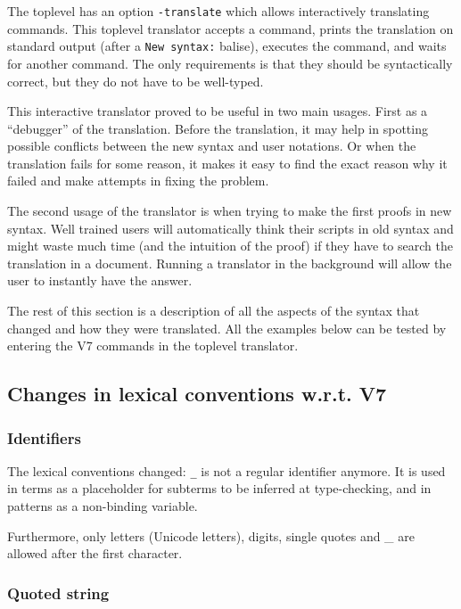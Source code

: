 \documentclass[11pt,a4paper]{article}
\def\TERM#1{\texttt{#1}}
\begin{document}
The toplevel has an option {\tt -translate} which allows
interactively translating commands. This toplevel translator accepts a
command, prints the translation on standard output (after a %
\verb+New syntax:+ balise), executes the command, and waits for another
command. The only requirements is that they should be syntactically
correct, but they do not have to be well-typed.

This interactive translator proved to be useful in two main
usages. First as a ``debugger'' of the translation. Before the
translation, it may help in spotting possible conflicts between the
new syntax and user notations. Or when the translation fails for some
reason, it makes it easy to find the exact reason why it failed and
make attempts in fixing the problem.

The second usage of the translator is when trying to make the first
proofs in new syntax. Well trained users will automatically think
their scripts in old syntax and might waste much time (and the
intuition of the proof) if they have to search the translation in a
document. Running a translator in the background will allow the user
to instantly have the answer.

The rest of this section is a description of all the aspects of the
syntax that changed and how they were translated. All the examples
below can be tested by entering the V7 commands in the toplevel
translator.



\subsection{Changes in lexical conventions w.r.t. V7}

\subsubsection{Identifiers}

The lexical conventions changed: \TERM{_} is not a regular identifier
anymore. It is used in terms as a placeholder for subterms to be inferred
at type-checking, and in patterns as a non-binding variable.

Furthermore, only letters (Unicode letters), digits, single quotes and
_ are allowed after the first character.

\subsubsection{Quoted string}
\end{document}
